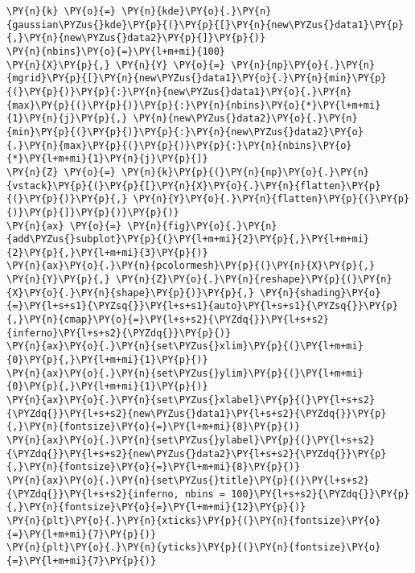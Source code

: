\begin{tcolorbox}[breakable, size=fbox, boxrule=1pt, pad at break*=1mm,colback=cellbackground, colframe=cellborder]
\begin{Verbatim}[commandchars=\\\{\}]
\PY{n}{k} \PY{o}{=} \PY{n}{kde}\PY{o}{.}\PY{n}{gaussian\PYZus{}kde}\PY{p}{(}\PY{p}{[}\PY{n}{new\PYZus{}data1}\PY{p}{,}\PY{n}{new\PYZus{}data2}\PY{p}{]}\PY{p}{)}
\PY{n}{nbins}\PY{o}{=}\PY{l+m+mi}{100}
\PY{n}{X}\PY{p}{,} \PY{n}{Y} \PY{o}{=} \PY{n}{np}\PY{o}{.}\PY{n}{mgrid}\PY{p}{[}\PY{n}{new\PYZus{}data1}\PY{o}{.}\PY{n}{min}\PY{p}{(}\PY{p}{)}\PY{p}{:}\PY{n}{new\PYZus{}data1}\PY{o}{.}\PY{n}{max}\PY{p}{(}\PY{p}{)}\PY{p}{:}\PY{n}{nbins}\PY{o}{*}\PY{l+m+mi}{1}\PY{n}{j}\PY{p}{,} \PY{n}{new\PYZus{}data2}\PY{o}{.}\PY{n}{min}\PY{p}{(}\PY{p}{)}\PY{p}{:}\PY{n}{new\PYZus{}data2}\PY{o}{.}\PY{n}{max}\PY{p}{(}\PY{p}{)}\PY{p}{:}\PY{n}{nbins}\PY{o}{*}\PY{l+m+mi}{1}\PY{n}{j}\PY{p}{]}
\PY{n}{Z} \PY{o}{=} \PY{n}{k}\PY{p}{(}\PY{n}{np}\PY{o}{.}\PY{n}{vstack}\PY{p}{(}\PY{p}{[}\PY{n}{X}\PY{o}{.}\PY{n}{flatten}\PY{p}{(}\PY{p}{)}\PY{p}{,} \PY{n}{Y}\PY{o}{.}\PY{n}{flatten}\PY{p}{(}\PY{p}{)}\PY{p}{]}\PY{p}{)}\PY{p}{)}
\PY{n}{ax} \PY{o}{=} \PY{n}{fig}\PY{o}{.}\PY{n}{add\PYZus{}subplot}\PY{p}{(}\PY{l+m+mi}{2}\PY{p}{,}\PY{l+m+mi}{2}\PY{p}{,}\PY{l+m+mi}{3}\PY{p}{)}
\PY{n}{ax}\PY{o}{.}\PY{n}{pcolormesh}\PY{p}{(}\PY{n}{X}\PY{p}{,} \PY{n}{Y}\PY{p}{,} \PY{n}{Z}\PY{o}{.}\PY{n}{reshape}\PY{p}{(}\PY{n}{X}\PY{o}{.}\PY{n}{shape}\PY{p}{)}\PY{p}{,} \PY{n}{shading}\PY{o}{=}\PY{l+s+s1}{\PYZsq{}}\PY{l+s+s1}{auto}\PY{l+s+s1}{\PYZsq{}}\PY{p}{,}\PY{n}{cmap}\PY{o}{=}\PY{l+s+s2}{\PYZdq{}}\PY{l+s+s2}{inferno}\PY{l+s+s2}{\PYZdq{}}\PY{p}{)}
\PY{n}{ax}\PY{o}{.}\PY{n}{set\PYZus{}xlim}\PY{p}{(}\PY{l+m+mi}{0}\PY{p}{,}\PY{l+m+mi}{1}\PY{p}{)}
\PY{n}{ax}\PY{o}{.}\PY{n}{set\PYZus{}ylim}\PY{p}{(}\PY{l+m+mi}{0}\PY{p}{,}\PY{l+m+mi}{1}\PY{p}{)}
\PY{n}{ax}\PY{o}{.}\PY{n}{set\PYZus{}xlabel}\PY{p}{(}\PY{l+s+s2}{\PYZdq{}}\PY{l+s+s2}{new\PYZus{}data1}\PY{l+s+s2}{\PYZdq{}}\PY{p}{,}\PY{n}{fontsize}\PY{o}{=}\PY{l+m+mi}{8}\PY{p}{)}
\PY{n}{ax}\PY{o}{.}\PY{n}{set\PYZus{}ylabel}\PY{p}{(}\PY{l+s+s2}{\PYZdq{}}\PY{l+s+s2}{new\PYZus{}data2}\PY{l+s+s2}{\PYZdq{}}\PY{p}{,}\PY{n}{fontsize}\PY{o}{=}\PY{l+m+mi}{8}\PY{p}{)}
\PY{n}{ax}\PY{o}{.}\PY{n}{set\PYZus{}title}\PY{p}{(}\PY{l+s+s2}{\PYZdq{}}\PY{l+s+s2}{inferno, nbins = 100}\PY{l+s+s2}{\PYZdq{}}\PY{p}{,}\PY{n}{fontsize}\PY{o}{=}\PY{l+m+mi}{12}\PY{p}{)}
\PY{n}{plt}\PY{o}{.}\PY{n}{xticks}\PY{p}{(}\PY{n}{fontsize}\PY{o}{=}\PY{l+m+mi}{7}\PY{p}{)}
\PY{n}{plt}\PY{o}{.}\PY{n}{yticks}\PY{p}{(}\PY{n}{fontsize}\PY{o}{=}\PY{l+m+mi}{7}\PY{p}{)}


\end{Verbatim}
\end{tcolorbox}
